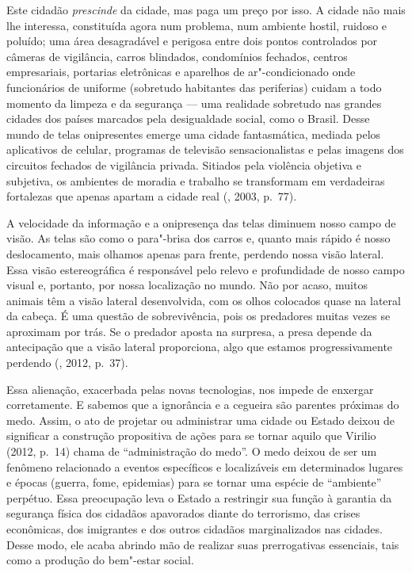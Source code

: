 Este cidadão \emph{prescinde} da cidade, mas paga um preço por isso. A
cidade não mais lhe interessa, constituída agora num problema, num
ambiente hostil, ruidoso e poluído; uma área desagradável e perigosa
entre dois pontos controlados por câmeras de vigilância, carros
blindados, condomínios fechados, centros empresariais, portarias
eletrônicas e aparelhos de ar"-condicionado onde funcionários de uniforme
(sobretudo habitantes das periferias) cuidam a todo momento da limpeza e
da segurança --- uma realidade sobretudo nas grandes cidades dos países
marcados pela desigualdade social, como o Brasil. Desse mundo de telas
onipresentes emerge uma cidade fantasmática, mediada pelos aplicativos
de celular, programas de televisão sensacionalistas e pelas imagens dos
circuitos fechados de vigilância privada. Sitiados pela violência
objetiva e subjetiva, os ambientes de moradia e trabalho se transformam
em verdadeiras fortalezas que apenas apartam a cidade real (,
2003, p.~77).

A velocidade da informação e a onipresença das telas diminuem nosso
campo de visão. As telas são como o para"-brisa dos carros e, quanto mais
rápido é nosso deslocamento, mais olhamos apenas para frente, perdendo
nossa visão lateral. Essa visão estereográfica é responsável pelo relevo
e profundidade de nosso campo visual e, portanto, por nossa localização
no mundo. Não por acaso, muitos animais têm a visão lateral
desenvolvida, com os olhos colocados quase na lateral da cabeça. É uma
questão de sobrevivência, pois os predadores muitas vezes se aproximam
por trás. Se o predador aposta na surpresa, a presa depende da
antecipação que a visão lateral proporciona, algo que estamos
progressivamente perdendo (, 2012, p.~37).

Essa alienação, exacerbada pelas novas tecnologias, nos impede de
enxergar corretamente. E sabemos que a ignorância e a cegueira são
parentes próximas do medo. Assim, o ato de projetar ou administrar uma
cidade ou Estado deixou de significar a construção propositiva de ações
para se tornar aquilo que Virilio (2012, p.~14) chama de ``administração
do medo''. O medo deixou de ser um fenômeno relacionado a eventos
específicos e localizáveis em determinados lugares e épocas (guerra,
fome, epidemias) para se tornar uma espécie de ``ambiente'' perpétuo.
Essa preocupação leva o Estado a restringir sua função à garantia da
segurança física dos cidadãos apavorados diante do terrorismo, das
crises econômicas, dos imigrantes e dos outros cidadãos marginalizados
nas cidades. Desse modo, ele acaba abrindo mão de realizar suas
prerrogativas essenciais, tais como a produção do bem"-estar social.

